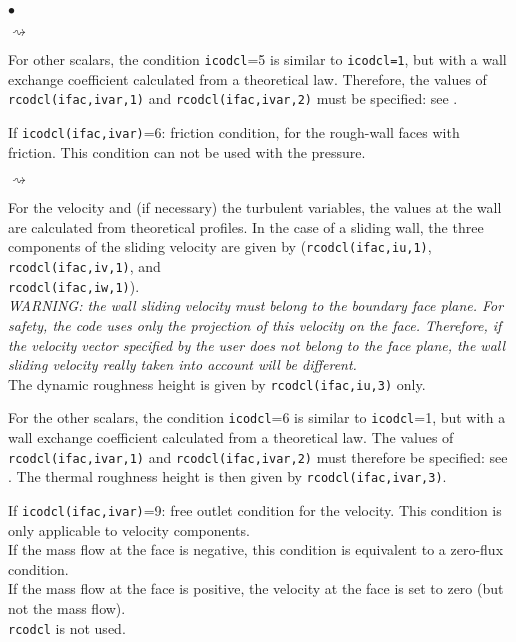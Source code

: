 {{{\begin{list}{$\bullet$}{}
\begin{list}{$\rightsquigarrow$}{}
\item For other scalars, the condition \texttt{icodcl}=5 is similar to
      \texttt{icodcl=1}, but with a wall exchange coefficient calculated from a
      theoretical law. Therefore, the values of \\\texttt{rcodcl(ifac,ivar,1)} and
      \texttt{rcodcl(ifac,ivar,2)} must be specified: see \cite{theory}.
\end{list}

\item If \texttt{icodcl(ifac,ivar)}=6: friction condition, for the rough-wall faces
      with friction. This condition can not be used with the pressure.
\begin{list}{$\rightsquigarrow$}{}
\item For the velocity and (if necessary) the turbulent variables, the
      values at the wall are calculated from theoretical profiles. In
      the case of a sliding wall, the three components of the sliding
      velocity are given by (\texttt{rcodcl(ifac,iu,1)},
      \texttt{rcodcl(ifac,iv,1)}, and \\\texttt{rcodcl(ifac,iw,1)}).\\
      {\em WARNING: the wall sliding velocity must belong to the boundary face
      plane. For safety, the code uses only the projection of this
      velocity on the face. Therefore, if the velocity vector specified
      by the user does not belong to the face plane, the wall sliding velocity really
      taken into account will be different.}\\
      The dynamic roughness height is given by \texttt{rcodcl(ifac,iu,3)} only.

\item For the other scalars, the condition \texttt{icodcl}=6 is similar to
      \texttt{icodcl}=1, but with a wall exchange coefficient calculated from a
      theoretical law. The values of \texttt{rcodcl(ifac,ivar,1)} and
      \texttt{rcodcl(ifac,ivar,2)} must therefore be specified: see \cite{theory}.
      The thermal roughness height is then given by \texttt{rcodcl(ifac,ivar,3)}.
\end{list}

\item If \texttt{icodcl(ifac,ivar)}=9: free outlet condition for the
      velocity. This condition is only applicable to velocity
      components.\\
      If the mass flow at the face is negative, this condition is equivalent
      to a zero-flux condition.\\
      If the mass flow at the face is positive, the velocity at the face is set to zero (but not the mass flow).\\
\texttt{rcodcl} is not used.


\end{list}}}}
